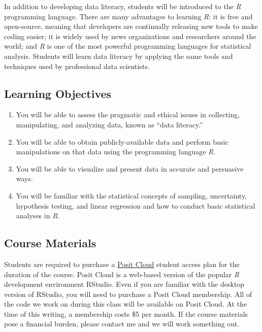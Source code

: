 \documentclass[12pt,letterpaper]{article}
\begin{document}
In addition to developing data literacy, students will be introduced to the \textit{R} programming language. There are many advantages to learning \textit{R}: it is free and open-source, meaning that developers are continually releasing new tools to make coding easier; it is widely used by news organizations and researchers around the world; and \textit{R} is one of the most powerful programming languages for statistical analysis. Students will learn data literacy by applying the same tools and techniques used by professional data scientists.

\subsection*{Learning Objectives}

\begin{enumerate}
    \item You will be able to assess the pragmatic and ethical issues in collecting, manipulating, and analyzing data, known as ``data literacy.''
    \item You will be able to obtain publicly-available data and perform basic manipulations on that data using the programming language \textit{R}.
    \item You will be able to visualize and present data in accurate and persuasive ways.
    \item You will be familiar with the statistical concepts of sampling, uncertainty, hypothesis testing, and linear regression and how to conduct basic statistical analyses in \textit{R}.
\end{enumerate}
\vspace{-.5em}

\subsection*{Course Materials}

Students are required to purchase a \href{https://posit.cloud/}{Posit Cloud} student access plan for the duration of the course. Posit Cloud is a web-based version of the popular \textit{R} development environment RStudio. Even if you are familiar with the desktop version of RStudio, you will need to purchase a Posit Cloud membership. All of the code we work on during this class will be available on Posit Cloud. At the time of this writing, a membership costs \$5 per month. If the course materials pose a financial burden, please contact me and we will work something out.
\end{document}

